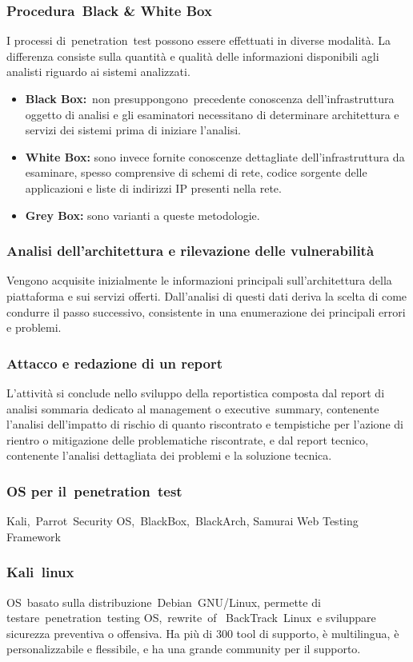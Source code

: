 \documentclass{article}
\begin{document}
\subsubsection{Procedura Black \& White Box}
I processi di penetration test possono essere effettuati in diverse modalità. La differenza consiste 
sulla quantità e qualità delle informazioni disponibili agli analisti riguardo ai sistemi analizzati.
\begin{itemize}
    \item \textbf{Black Box:} non presuppongono precedente conoscenza dell'infrastruttura oggetto di analisi 
    e gli esaminatori necessitano di determinare architettura e servizi dei sistemi prima di iniziare l'analisi.
    \item \textbf{White Box:} sono invece fornite conoscenze dettagliate dell'infrastruttura da esaminare, 
    spesso comprensive di schemi di rete, codice sorgente delle applicazioni e liste di indirizzi 
    IP presenti nella rete.
    \item \textbf{Grey Box:} sono varianti a queste metodologie.
\end{itemize}
\subsubsection{Analisi dell’architettura e rilevazione delle vulnerabilità}
Vengono acquisite inizialmente le informazioni principali sull'architettura della piattaforma e sui servizi 
offerti. Dall'analisi di questi dati deriva la scelta di come condurre il passo successivo, consistente in 
una enumerazione dei principali errori e problemi. 
\subsubsection{Attacco e redazione di un report}
L'attività si conclude nello sviluppo della reportistica composta dal report di analisi sommaria dedicato 
al management o executive summary, contenente l'analisi dell'impatto di rischio di quanto riscontrato e 
tempistiche per l'azione di rientro o mitigazione delle problematiche riscontrate, e dal report tecnico, 
contenente l'analisi dettagliata dei problemi e la soluzione tecnica. 
\subsubsection{OS per il penetration test}
Kali, Parrot Security OS, BlackBox, BlackArch, Samurai Web Testing Framework 
\subsubsection{Kali linux}
OS basato sulla distribuzione Debian GNU/Linux, permette di testare penetration testing OS, rewrite of 
BackTrack Linux e sviluppare sicurezza preventiva o offensiva. Ha più di 300 tool di supporto, è 
multilingua, è personalizzabile e flessibile, e ha una grande community per il supporto.
\end{document}
